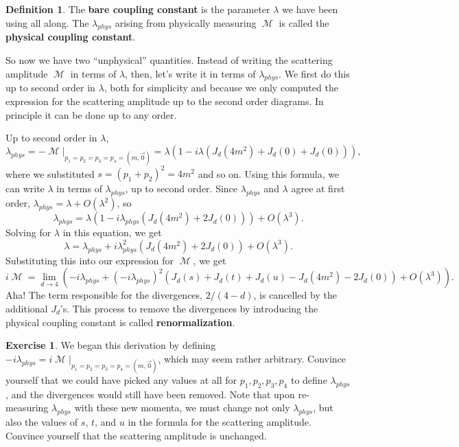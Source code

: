 \documentclass{report}
\theoremstyle{plain}
\theoremstyle{definition}
\newtheorem{definition}[theorem]{Definition}
\newtheorem{exercise}{Exercise}[section]
\theoremstyle{remark}
\DeclareMathOperator{\cM}{\mathcal{M}}
\begin{document}
\begin{definition}
  The {\bf bare coupling constant} is the parameter $\lambda$ we have
  been using all along. The $\lambda_{phys}$ arising from physically
  measuring $\cM$ is called the {\bf physical coupling constant}.
\end{definition}

So now we have two ``unphysical'' quantities. Instead of writing the
scattering amplitude $\cM$ in terms of $\lambda$, then, let's write it
in terms of $\lambda_{phys}$. We first do this up to second order in
$\lambda$, both for simplicity and because we only computed the
expression for the scattering amplitude up to the second order
diagrams. In principle it can be done up to any order.

Up to second order in $\lambda$, 
$$ \lambda_{phys} = -\cM|_{p_1=p_2=p_3=p_4=(m,\vec{0})} = \lambda\left(1 - i\lambda(J_d(4m^2) + J_d(0) + J_d(0))\right), $$
where we substituted $s = (p_1 + p_2)^2 = 4m^2$ and so on. Using this
formula, we can write $\lambda$ in terms of $\lambda_{phys}$, up to
second order. Since $\lambda_{phys}$ and $\lambda$ agree at first
order, $\lambda_{phys} = \lambda + O(\lambda^2)$, so
$$ \lambda_{phys} = \lambda\left(1 - i\lambda_{phys}(J_d(4m^2) + 2J_d(0))\right) + O(\lambda^3). $$
Solving for $\lambda$ in this equation, we get
$$ \lambda = \lambda_{phys} + i\lambda_{phys}^2(J_d(4m^2) + 2J_d(0)) + O(\lambda^3). $$
Substituting this into our expression for $\cM$, we get
$$ i\cM = \lim_{d \to 4} \left(-i\lambda_{phys} + (-i\lambda_{phys})^2(J_d(s) + J_d(t) + J_d(u) - J_d(4m^2) - 2J_d(0)) + O(\lambda^3) \right). $$
Aha! The term responsible for the divergences, $2/(4-d)$, is cancelled
by the additional $J_d$'s. This process to remove the divergences by
introducing the physical coupling constant is called {\bf
  renormalization}.

\begin{exercise}
  We began this derivation by defining
  $-i\lambda_{phys} = i\cM|_{p_1=p_2=p_3=p_4=(m,\vec{0})}$, which may
  seem rather arbitrary. Convince yourself that we could have picked
  any values at all for $p_1, p_2, p_3, p_4$ to define
  $\lambda_{phys}$, and the divergences would still have been removed.
  Note that upon re-measuring $\lambda_{phys}$ with these new momenta,
  we must change not only $\lambda_{phys}$, but also the values of
  $s$, $t$, and $u$ in the formula for the scattering amplitude.
  Convince yourself that the scattering amplitude is unchanged.
\end{exercise}
\end{document}
